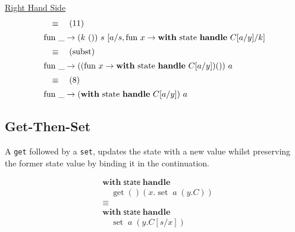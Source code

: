 \documentclass[logo,bsc,singlespacing,parskip]{infthesis}
\begin{document}
\underline{Right Hand Side}
\[ 
\begin{array}{l}
\quad\equiv\quad (11) \\[5pt]
\text{fun }\_ \rightarrow (k\ ())\ s\ [a/s, \text{fun } x \rightarrow \text{\textbf{with} state \textbf{handle} } C[a/y]/k] \\[5pt]
\quad\equiv\quad (\text{subst}) \\[5pt]
\text{fun }\_ \rightarrow ((\text{fun } x \rightarrow \text{\textbf{with} state \textbf{handle} } C[a/y]) ())\ a \\[5pt]
\quad\equiv\quad (8) \\[5pt]
\text{fun }\_ \rightarrow (\text{\textbf{with} state \textbf{handle} } C[a/y])\ a
\end{array}
\]



\subsection{Get-Then-Set}
A \lstinline{get} followed by a \lstinline{set}, updates the state with a new value whilst preserving the former state value by binding it in the continuation. 


\[
\begin{aligned}
    &\mathsf{\textbf{with}} \; \mathsf{state} \; \mathsf{\textbf{handle}} \\
    &\quad \operatorname{get}() \left( x. \operatorname{set} \; a \; (y. C) \right) \\
    &\equiv \\
    &\mathsf{\textbf{with}} \; \mathsf{state} \; \mathsf{\textbf{handle}} \\
    &\quad \operatorname{set} \; a \; (y. C[s/x])
\end{aligned}
\]
\end{document}
